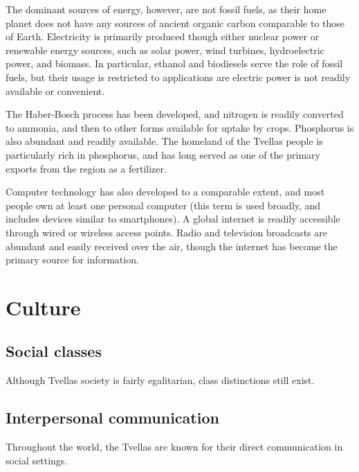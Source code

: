 The dominant sources of energy, however, are not fossil fuels, as their home planet does not have
any sources of ancient organic carbon comparable to those of Earth. Electricity is primarily
produced though either nuclear power or renewable energy sources, such as solar power, wind 
turbines, hydroelectric power, and biomass. In particular, ethanol and biodiesels serve the role of
fossil fuels, but their usage is restricted to applications are electric power is not readily
available or convenient.

The Haber-Bosch process has been developed, and nitrogen is readily converted to ammonia, and then
to other forms available for uptake by crops. Phosphorus is also abundant and readily available.
The homeland of the Tvellas people is particularly rich in phosphorus, and has long served as one
of the primary exports from the region as a fertilizer.

Computer technology has also developed to a comparable extent, and most people own at least one
personal computer (this term is used broadly, and includes devices similar to smartphones). A global
internet is readily accessible through wired or wireless access points. Radio and television
broadcasts are abundant and easily received over the air, though the internet has become the primary
source for information.

\section{Culture}

\subsection{Social classes}

Although Tvellas society is fairly egalitarian, class distinctions still exist.

\subsection{Interpersonal communication}

Throughout the world, the Tvellas are known for their direct communication in social settings.
